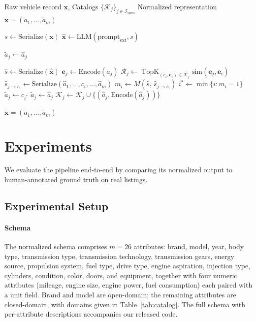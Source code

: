 \documentclass[conference]{IEEEtran}
\begin{document}
\begin{algorithm}
\caption{Vehicle Normalization.}
\label{algo:normalization}
\begin{algorithmic}[1]
\Require Raw vehicle record $\mathbf{x}$,
Catalogs $\{\mathcal{K}_j\}_{j \in \mathcal{I}_{\text{open}}}$
\Ensure Normalized representation
$\tilde{\mathbf{x}} = (\tilde{a}_1, \dots, \tilde{a}_m)$

\State $s \gets \text{Serialize}(\mathbf{x})$
\State $\hat{\mathbf{x}} \gets
\text{LLM}(\text{prompt}_{\text{ext}}, s)$

    \State $\tilde{a}_j \gets \hat{a}_j$
\EndFor

\State $\hat{s} \gets \text{Serialize}(\hat{\mathbf{x}})$
    \State $\mathbf{e}_j \gets \text{Encode}(\hat{a}_j)$
    \State $\mathcal{R}_j \gets
    \operatorname{TopK}_{(c_i, \mathbf{e}_i) \in \mathcal{K}_j}
    \text{sim}(\mathbf{e}_j, \mathbf{e}_i)$
        \State $\hat{s}_{j \to c_i} \gets
        \text{Serialize}(\hat{a}_1, \dots, c_i, \dots, \hat{a}_m)$
        \State $m_i \gets M(\hat{s},\, \hat{s}_{j \to c_i})$
    \EndFor
        \State $i^* \gets \min\{i : m_i = 1\}$
        \State $\tilde{a}_j \gets c_{i^*}$
    \Else
        \State $\tilde{a}_j \gets \hat{a}_j$
        \State $\mathcal{K}_j \leftarrow \mathcal{K}_j \cup
        \{(\hat{a}_j, \text{Encode}(\hat{a}_j))\}$
    \EndIf
\EndFor

\State \Return $\tilde{\mathbf{x}} = (\tilde{a}_1, \dots, \tilde{a}_m)$
\end{algorithmic}
\end{algorithm}

\section{Experiments}

We evaluate the pipeline end-to-end by comparing its normalized output
to human-annotated ground truth on real listings.

\subsection{Experimental Setup}
\label{sec:setup}

\paragraph{Schema}
The normalized schema comprises $m = 26$ attributes: brand, model,
year, body type, transmission type, transmission technology,
transmission gears, energy source, propulsion system, fuel type,
drive type, engine aspiration, injection type, cylinders, condition,
color, doors, and equipment, together with four numeric attributes
(mileage, engine size, engine power, fuel consumption) each paired
with a unit field. Brand and model are open-domain; the remaining
attributes are closed-domain, with domains given in
Table~\ref{tab:catalog}. The full schema with per-attribute
descriptions accompanies our released code.
\end{document}
